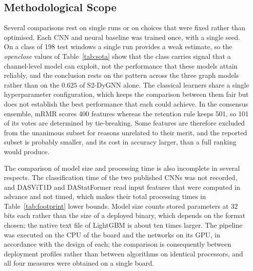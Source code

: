 \subsection{Methodological Scope}
\label{sec:chap5LimMethod}
Several comparisons rest on single runs or on choices that were fixed rather than optimised. Each CNN and neural baseline was trained once, with a single seed. On a class of 198 test windows a single run provides a weak estimate, so the \emph{openclose} values of Table~\ref{tab:sota} show that the class carries signal that a channel-level model can exploit, not the performance that these models attain reliably, and the conclusion rests on the pattern across the three graph models rather than on the $0.625$ of S2-DyGNN alone. The classical learners share a single hyperparameter configuration, which keeps the comparison between them fair but does not establish the best performance that each could achieve. In the consensus ensemble, mRMR scores 400 features whereas the retention rule keeps 501, so 101 of its votes are determined by tie-breaking. Some features are therefore excluded from the unanimous subset for reasons unrelated to their merit, and the reported subset is probably smaller, and its cost in accuracy larger, than a full ranking would produce.

The comparison of model size and processing time is also incomplete in several respects. The classification time of the two published CNNs was not recorded, and DASViT1D and DAStatFormer read input features that were computed in advance and not timed, which makes their total processing times in Table~\ref{tab:footprint} lower bounds. Model size counts stored parameters at 32 bits each rather than the size of a deployed binary, which depends on the format chosen; the native text file of LightGBM is about ten times larger. The pipeline was executed on the CPU of the board and the networks on its GPU, in accordance with the design of each; the comparison is consequently between deployment profiles rather than between algorithms on identical processors, and all four measures were obtained on a single board.

